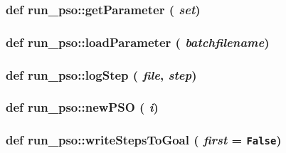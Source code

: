 \hypertarget{namespacerun__pso_84392595c0c0714134b84736072a2c8c}{
\subsubsection{\setlength{\rightskip}{0pt plus 5cm}def run\_\-pso::getParameter ( {\em set})}}
\label{namespacerun__pso_84392595c0c0714134b84736072a2c8c}


\hypertarget{namespacerun__pso_b5e79fe0acdb6ad14ee29f1b773b2e42}{
\subsubsection{\setlength{\rightskip}{0pt plus 5cm}def run\_\-pso::loadParameter ( {\em batchfilename})}}
\label{namespacerun__pso_b5e79fe0acdb6ad14ee29f1b773b2e42}


\hypertarget{namespacerun__pso_4471c9ccd03dda5e24d1b11ff2431154}{
\subsubsection{\setlength{\rightskip}{0pt plus 5cm}def run\_\-pso::logStep ( {\em file}, \/   {\em step})}}
\label{namespacerun__pso_4471c9ccd03dda5e24d1b11ff2431154}


\hypertarget{namespacerun__pso_2ec844ebf0526db2fa3f2445a6ac1511}{
\subsubsection{\setlength{\rightskip}{0pt plus 5cm}def run\_\-pso::newPSO ( {\em i})}}
\label{namespacerun__pso_2ec844ebf0526db2fa3f2445a6ac1511}


\hypertarget{namespacerun__pso_3cac3122694e2c354f88c9321edcb21f}{
\subsubsection{\setlength{\rightskip}{0pt plus 5cm}def run\_\-pso::writeStepsToGoal ( {\em first} = {\tt False})}}
\label{namespacerun__pso_3cac3122694e2c354f88c9321edcb21f}




